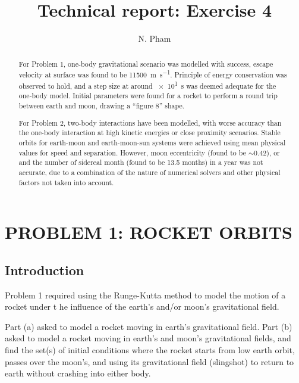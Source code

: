 \documentclass[hyphens,twocolumn,nobalancelastpage,aps,10pt,citeautoscript,longbibliography]{revtex4-2}
\begin{document}
\title{Technical report: Exercise 4}

\author{N. Pham}

\begin{abstract}
	For Problem 1, one-body gravitational scenario was modelled with success,
	escape velocity at surface was found to be \qty{11500}{\metre\per\second}.
	Principle of energy conservation was observed to hold, and a step size at
	around \qty{e1}{\second} was deemed adequate for the one-body model.
	Initial parameters were found for a rocket to perform a round trip between
	earth and moon, drawing a ``figure 8'' shape.

	For Problem 2, two-body interactions have been modelled, with worse
	accuracy than the one-body interaction at high kinetic energies or close
	proximity scenarios. Stable orbits for earth-moon and earth-moon-sun
	systems were achieved using mean physical values for speed and separation.
	However, moon eccentricity (found to be $\sim$0.42), or and the number of
	sidereal month (found to be 13.5 months) in a year was not accurate, due to
	a combination of the nature of numerical solvers and other physical factors
	not taken into account.
\end{abstract}

\maketitle

\section{PROBLEM 1: ROCKET ORBITS}%
\label{sec:problem_1}

\subsection{Introduction}%
\label{sub:introduction_1}

\noindent Problem 1 required using the Runge-Kutta method to model the motion
of a rocket under t he influence of the earth's and/or moon's gravitational
field.

Part (a) asked to model a rocket moving in earth's gravitational field. Part
(b) asked to model a rocket moving in earth's and moon's gravitational fields,
and find the set(s) of initial conditions where the rocket starts from low
earth orbit, passes over the moon's, and using its gravitational field
(slingshot) to return to earth without crashing into either body.
\end{document}
